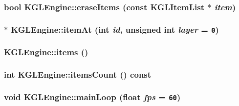 \hypertarget{class_k_g_l_engine_b7f3be194234b978df3f59769f565588}{
\subsubsection[{eraseItems}]{\setlength{\rightskip}{0pt plus 5cm}bool KGLEngine::eraseItems (const {\bf KGLItemList} $\ast$ {\em item})}}
\label{class_k_g_l_engine_b7f3be194234b978df3f59769f565588}


\hypertarget{class_k_g_l_engine_ac35be1039af0dbc2dc208774f085795}{
\subsubsection[{itemAt}]{ $\ast$ KGLEngine::itemAt (int {\em id}, \/  unsigned int {\em layer} = {\tt 0})}}
\label{class_k_g_l_engine_ac35be1039af0dbc2dc208774f085795}


\hypertarget{class_k_g_l_engine_4b105206ea488eea87e835339d5473b5}{
\subsubsection[{items}]{ KGLEngine::items ()}}
\label{class_k_g_l_engine_4b105206ea488eea87e835339d5473b5}


\hypertarget{class_k_g_l_engine_1cc02d12efbc07e9a40d420f081ba588}{
\subsubsection[{itemsCount}]{\setlength{\rightskip}{0pt plus 5cm}int KGLEngine::itemsCount () const}}
\label{class_k_g_l_engine_1cc02d12efbc07e9a40d420f081ba588}


\hypertarget{class_k_g_l_engine_787e1d8dfb58a6d6973a1f62c83b3263}{
\subsubsection[{mainLoop}]{\setlength{\rightskip}{0pt plus 5cm}void KGLEngine::mainLoop (float {\em fps} = {\tt 60})}}
\label{class_k_g_l_engine_787e1d8dfb58a6d6973a1f62c83b3263}




